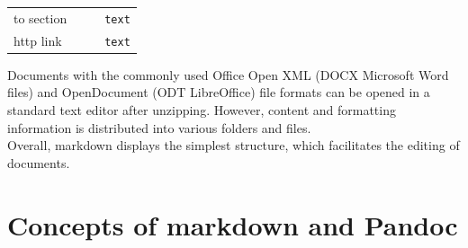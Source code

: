 \documentclass[10pt,fleq]{wlpeerj}
\begin{document}
\begin{longtable}[]{@{}llll@{}}
\begin{minipage}[t]{0.24\columnwidth}
to
section\strut
\end{minipage}
&
\begin{minipage}[t]{0.15\columnwidth}\raggedright\strut
\strut
\end{minipage}
&
\begin{minipage}[t]{0.26\columnwidth}\raggedright\strut
\strut
\end{minipage}
&
\begin{minipage}[t]{0.24\columnwidth}\raggedright\strut
\texttt{text}\strut
\end{minipage}\tabularnewline
\begin{minipage}[t]{0.24\columnwidth}\raggedright\strut
http
link\strut
\end{minipage}
&
\begin{minipage}[t]{0.15\columnwidth}\raggedright\strut
\strut
\end{minipage}
&
\begin{minipage}[t]{0.26\columnwidth}\raggedright\strut
\strut
\end{minipage}
&
\begin{minipage}[t]{0.24\columnwidth}\raggedright\strut
\texttt{text}\strut
\end{minipage}\tabularnewline
\bottomrule
\end{longtable}

Documents
with the
commonly
used
Office
Open XML
(DOCX
Microsoft
Word
files) and
OpenDocument
(ODT
LibreOffice)
file
formats
can be
opened in
a standard
text
editor
after
unzipping.
However,
content
and
formatting
information
is
distributed
into
various
folders
and
files.\\
Overall,
markdown
displays
the
simplest
structure,
which
facilitates
the
editing of
documents.

\section{Concepts
of
markdown
and
Pandoc}\label{concepts-of-markdown-and-pandoc}
\end{document}
